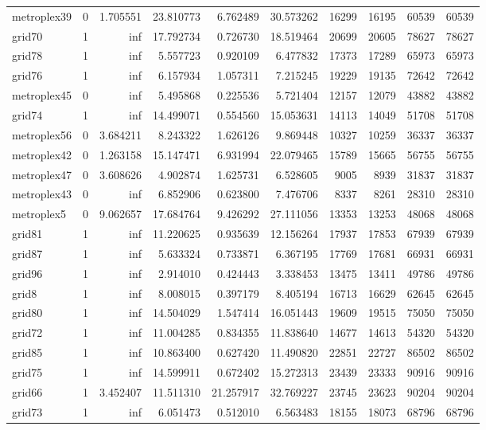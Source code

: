 \begin{longtable}{|l|r|r|r|r|r|r|r|r|r|}
metroplex39 & 0 & 1.705551 & 23.810773 & 6.762489 & 30.573262 & 16299 & 16195 & 60539 & 60539 \\
grid70 & 1 & inf & 17.792734 & 0.726730 & 18.519464 & 20699 & 20605 & 78627 & 78627 \\
grid78 & 1 & inf & 5.557723 & 0.920109 & 6.477832 & 17373 & 17289 & 65973 & 65973 \\
grid76 & 1 & inf & 6.157934 & 1.057311 & 7.215245 & 19229 & 19135 & 72642 & 72642 \\
metroplex45 & 0 & inf & 5.495868 & 0.225536 & 5.721404 & 12157 & 12079 & 43882 & 43882 \\
grid74 & 1 & inf & 14.499071 & 0.554560 & 15.053631 & 14113 & 14049 & 51708 & 51708 \\
metroplex56 & 0 & 3.684211 & 8.243322 & 1.626126 & 9.869448 & 10327 & 10259 & 36337 & 36337 \\
metroplex42 & 0 & 1.263158 & 15.147471 & 6.931994 & 22.079465 & 15789 & 15665 & 56755 & 56755 \\
metroplex47 & 0 & 3.608626 & 4.902874 & 1.625731 & 6.528605 & 9005 & 8939 & 31837 & 31837 \\
metroplex43 & 0 & inf & 6.852906 & 0.623800 & 7.476706 & 8337 & 8261 & 28310 & 28310 \\
metroplex5 & 0 & 9.062657 & 17.684764 & 9.426292 & 27.111056 & 13353 & 13253 & 48068 & 48068 \\
grid81 & 1 & inf & 11.220625 & 0.935639 & 12.156264 & 17937 & 17853 & 67939 & 67939 \\
grid87 & 1 & inf & 5.633324 & 0.733871 & 6.367195 & 17769 & 17681 & 66931 & 66931 \\
grid96 & 1 & inf & 2.914010 & 0.424443 & 3.338453 & 13475 & 13411 & 49786 & 49786 \\
grid8 & 1 & inf & 8.008015 & 0.397179 & 8.405194 & 16713 & 16629 & 62645 & 62645 \\
grid80 & 1 & inf & 14.504029 & 1.547414 & 16.051443 & 19609 & 19515 & 75050 & 75050 \\
grid72 & 1 & inf & 11.004285 & 0.834355 & 11.838640 & 14677 & 14613 & 54320 & 54320 \\
grid85 & 1 & inf & 10.863400 & 0.627420 & 11.490820 & 22851 & 22727 & 86502 & 86502 \\
grid75 & 1 & inf & 14.599911 & 0.672402 & 15.272313 & 23439 & 23333 & 90916 & 90916 \\
grid66 & 1 & 3.452407 & 11.511310 & 21.257917 & 32.769227 & 23745 & 23623 & 90204 & 90204 \\
grid73 & 1 & inf & 6.051473 & 0.512010 & 6.563483 & 18155 & 18073 & 68796 & 68796 \\

\end{longtable}
